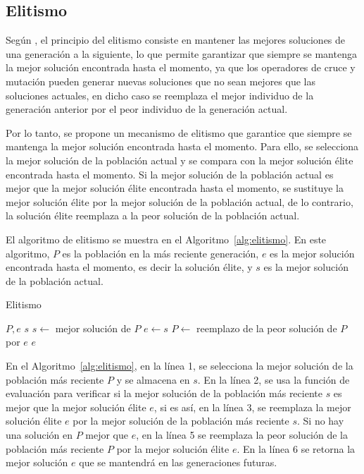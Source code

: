 \documentclass[openany]{article}
\begin{document}
\subsection{Elitismo}

Según \textcite{Hasni2013}, el principio del elitismo consiste en mantener las mejores soluciones de una generación a la siguiente, lo que permite garantizar que siempre se mantenga la mejor solución encontrada hasta el momento, ya que los operadores de cruce y mutación pueden generar nuevas soluciones que no sean mejores que las soluciones actuales, en dicho caso se reemplaza el mejor individuo de la generación anterior por el peor individuo de la generación actual.

Por lo tanto, se propone un mecanismo de elitismo que garantice que siempre se mantenga la mejor solución encontrada hasta el momento. Para ello, se selecciona la mejor solución de la población actual y se compara con la mejor solución élite encontrada hasta el momento. Si la mejor solución de la población actual es mejor que la mejor solución élite encontrada hasta el momento, se sustituye la mejor solución élite por la mejor solución de la población actual, de lo contrario, la solución élite reemplaza a la peor solución de la población actual.

El algoritmo de elitismo se muestra en el Algoritmo~\ref{alg:elitismo}. En este algoritmo, $P$ es la población en la más reciente generación, $e$ es la mejor solución encontrada hasta el momento, es decir la solución élite, y $s$ es la mejor solución de la población actual.

\begin{algorithm}[H]
    \caption{Elitismo}\label{alg:elitismo}
    \begin{algorithmic}[1]
        \Require $P, e$
        \Ensure $s$
        \State $s \leftarrow$ mejor solución de $P$
        \State $e \leftarrow s$
        \Else
        \State $P \leftarrow$ reemplazo de la peor solución de $P$ por $e$
        \EndIf
        \State \Return $e$
    \end{algorithmic}

\end{algorithm}

En el Algoritmo~\ref{alg:elitismo}, en la línea 1, se selecciona la mejor solución de la población más reciente $P$ y se almacena en $s$. En la línea 2, se usa la función de evaluación para verificar si la mejor solución de la población más reciente $s$ es mejor que la mejor solución élite $e$, si es así, en la línea 3, se reemplaza la mejor solución élite $e$ por la mejor solución de la población más reciente $s$. Si no hay una solución en $P$ mejor que $e$, en la línea 5 se reemplaza la peor solución de la población más reciente $P$ por la mejor solución élite $e$. En la línea 6 se retorna la mejor solución $e$ que se mantendrá en las generaciones futuras.
\end{document}
